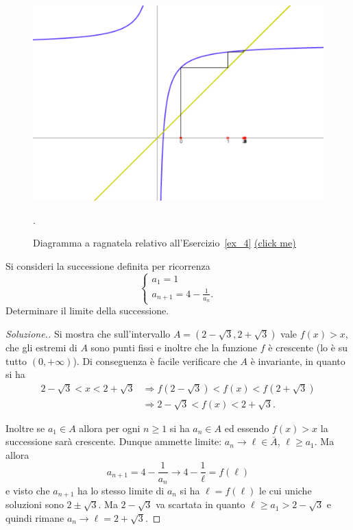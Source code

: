 \documentclass[italian,a4paper]{scrartcl}
\newcommand{\online}[1]{\href{http://paolini.github.io/recurrence/?#1}{\underline{(click
      me)}}}
\begin{document}
\begin{figure}
  \begin{center}
    \includegraphics[width=\textwidth]{fig_ex_4.png}
  \end{center}
  \caption{Diagramma a ragnatela relativo
    all'Esercizio~\ref{ex_4} \online{expr=4-1\%2Fx&x=1&scale=50&yoff=1&xoff=1}}.
  \label{fig_ex_4}
\end{figure}

\begin{exercise}\label{ex_4}
  Si consideri la successione definita per ricorrenza
  \[
  \begin{cases}
    a_1 = 1\\
    a_{n+1} =4-\frac 1 {a_n}.
  \end{cases}
  \]
  Determinare il limite della successione.
\end{exercise}

\begin{proof}[Soluzione.]
  Si mostra che sull'intervallo $A=(2-\sqrt 3, 2+\sqrt 3)$
  vale $f(x)>x$, che gli estremi di $A$ sono punti fissi
  e inoltre che la funzione $f$ è crescente (lo è su tutto $(0,+\infty)$).
  Di conseguenza è facile verificare che $A$ è invariante, in quanto si ha
  \begin{align*}
  2-\sqrt 3 < x < 2+\sqrt 3 &\Rightarrow
  f(2-\sqrt 3) < f(x) < f(2+\sqrt 3)\\
  &\Rightarrow
  2-\sqrt 3 < f(x) < 2+\sqrt 3.
  \end{align*}

  Inoltre se $a_1 \in A$ allora per ogni $n\ge 1$ si ha $a_n\in A$ ed essendo
  $f(x)>x$ la successione sarà crescente. Dunque ammette
  limite: $a_n \to \ell \in \bar A$, $\ell \ge a_1$. Ma allora
  \[
  a_{n+1} = 4-\frac 1 {a_n} \to 4 - \frac 1 \ell = f(\ell)
  \]
  e visto che $a_{n+1}$ ha lo stesso limite di $a_n$ si ha $\ell =
  f(\ell)$ le cui uniche soluzioni sono $2\pm \sqrt 3$. Ma $2-\sqrt 3$
  va scartata in quanto $\ell\ge a_1 > 2-\sqrt 3$ e quindi rimane
  $a_n \to \ell = 2+\sqrt 3$.
\end{proof}
\end{document}

